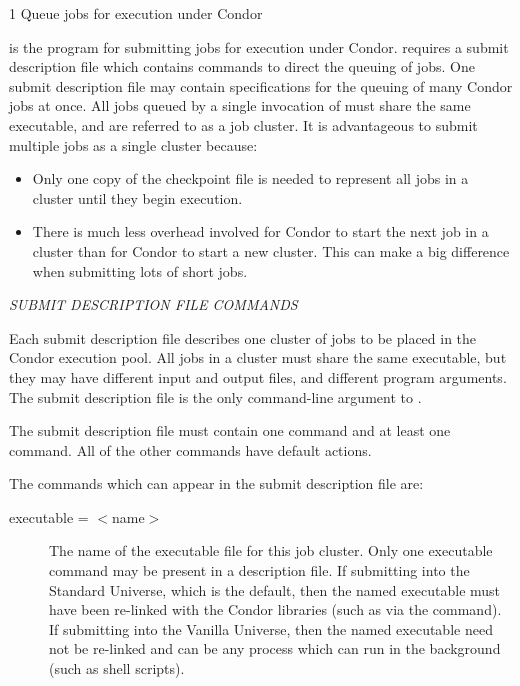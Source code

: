 \begin{ManPage}{\label{man-condor-submit}}{1}
{Queue jobs for execution under Condor}
\Synopsis {}
\oOpt{--}


\Description

 is the program for submitting jobs for execution
under Condor.
 requires a submit description file which contains commands
to direct the queuing of jobs. One submit description file may contain
specifications for the queuing of many Condor jobs at once.
All jobs queued by a
single invocation of  must share the same executable, and
are referred to as a job cluster. It is advantageous to submit
multiple jobs as a single cluster because:
\begin{itemize}
\item Only one copy of the checkpoint file is needed to 
represent all jobs in a cluster until they begin execution.
\item There is much less overhead involved for Condor to start the next
job in a cluster than for Condor to start a new cluster.  This can make
a big difference when submitting lots of short jobs.
\end{itemize}

\emph{SUBMIT DESCRIPTION FILE COMMANDS}

Each submit description file describes one cluster of jobs to be
placed in the Condor execution pool. All jobs in a cluster must share
the same executable, but they may have different input and output files,
and different program arguments. The submit description file is
the only command-line argument to . 

The submit description file must contain one  command and at least one
 command.  All of the other commands have default actions.

The commands which can appear in the submit description file are:

\begin{description} 


\item[executable = $<$name$>$]The name of the executable file for this
job cluster. Only one executable command may be present in a description
file. If submitting into the Standard Universe, which is the default,
then the named executable must have been re-linked with the Condor
libraries (such as via the  command). If submitting into
the Vanilla Universe, then the named executable need not be re-linked and
can be any process which can run in the background (such as shell scripts).


\end{description}
\end{ManPage}
